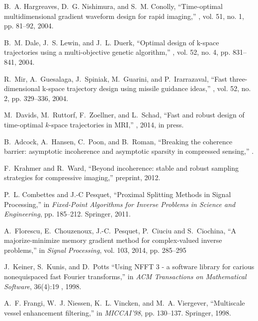 \documentclass{article}
\begin{document}
{\begin{thebibliography}{10}
B.~A. Hargreaves, D.~G. Nishimura, and S.~M. Conolly,
\newblock ``Time-optimal multidimensional gradient waveform design for rapid
  imaging,''
, vol. 51, no. 1, pp. 81--92,
  2004.

B.~M. Dale, J.~S. Lewin, and J.~L. Duerk,
\newblock ``Optimal design of k-space trajectories using a multi-objective
  genetic algorithm,''
, vol. 52, no. 4, pp. 831--841,
  2004.

R.~Mir, A.~Guesalaga, J.~Spiniak, M.~Guarini, and P.~Irarrazaval,
\newblock ``Fast three-dimensional k-space trajectory design using missile
  guidance ideas,''
, vol. 52, no. 2, pp. 329--336,
  2004.

M.~Davids, M.~Ruttorf, F.~Zoellner, and L.~Schad,
\newblock ``Fast and robust design of time-optimal $k$-space trajectories in
  {MRI},''
, 2014,
\newblock in press.

B.~Adcock, A.~Hansen, C.~Poon, and B.~Roman,
\newblock ``Breaking the coherence barrier: asymptotic incoherence and
  asymptotic sparsity in compressed sensing,''
.

F.~Krahmer and R.~Ward,
\newblock ``Beyond incoherence: stable and robust sampling strategies for
  compressive imaging,''
\newblock preprint, 2012.

P.~L. Combettes and J.-C Pesquet,
\newblock ``{Proximal Splitting Methods in Signal Processing},''
\newblock in {\em {Fixed-Point Algorithms for Inverse Problems in Science and
  Engineering}}, pp. 185--212. Springer, 2011.

A.~Florescu, E.~Chouzenoux, J.-C.~Pesquet, P.~Ciuciu and S.~Ciochina,
\newblock ``A majorize-minimize memory gradient method for complex-valued inverse problems,''
\newblock in {\em {Signal Processing}}, vol. 103, 2014, pp. 285--295

J.~Keiner, S.~Kunis, and D.~Potts
\newblock ``Using NFFT 3 - a software library for carious nonequispaced fast Fourier transforms,''
\newblock in {\em  ACM Transactions on Mathematical Software}, 36(4):19
, 1998.

A.~F. Frangi, W.~J. Niessen, K.~L. Vincken, and M.~A. Viergever,
\newblock ``Multiscale vessel enhancement filtering,''
\newblock in {\em MICCAI'98}, pp. 130--137. Springer, 1998.

\end{thebibliography}
}
\end{document}

